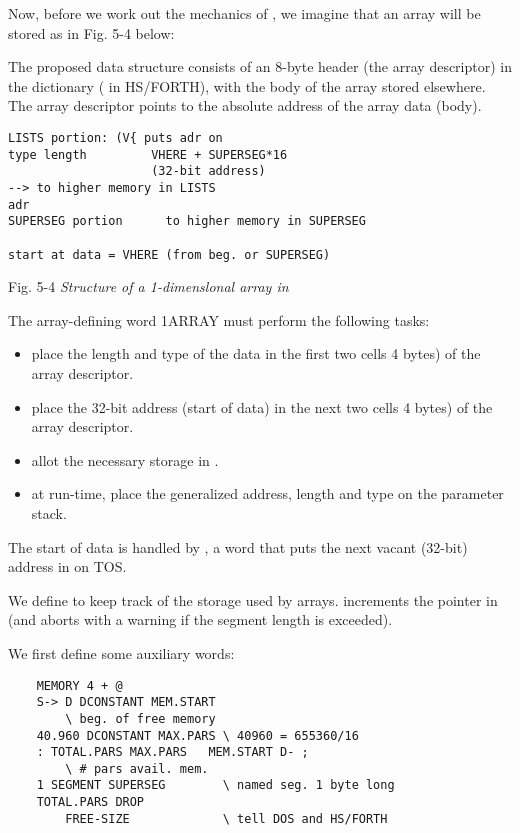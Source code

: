 {{Now, before we work out the mechanics of , we imagine that an array will be stored as in Fig. 5-4 below:

The proposed data structure consists of an 8-byte header (the array descriptor) in the dictionary ( in HS/FORTH), with the body of the array stored elsewhere. The array descriptor points to the absolute address of the array data (body).

\begin{lstlisting}
LISTS portion: (V{ puts adr on
type length         VHERE + SUPERSEG*16
                    (32-bit address)
--> to higher memory in LISTS 
adr
SUPERSEG portion      to higher memory in SUPERSEG

start at data = VHERE (from beg. or SUPERSEG)
\end{lstlisting}

Fig. 5-4 \textit{Structure of a 1-dimenslonal array in }

The array-defining word 1ARRAY must perform the following
tasks:

\begin{itemize}
    \item place the length and type of the data in the first two cells 4 bytes) of the array descriptor.
    \item place the 32-bit address (start of data) in the next two cells 4 bytes) of the array descriptor.
    \item allot the necessary storage in .
    \item at run-time, place the generalized address, length and type on the parameter stack.
\end{itemize}

The start of data is handled by , a word that puts the next vacant (32-bit) address in  on TOS.

We define  to keep track of the storage used by arrays.  increments the pointer in  (and aborts with a warning if the segment length is exceeded).

We first define some auxiliary words:
\begin{lstlisting}
    MEMORY 4 + @
    S-> D DCONSTANT MEM.START
        \ beg. of free memory
    40.960 DCONSTANT MAX.PARS \ 40960 = 655360/16
    : TOTAL.PARS MAX.PARS   MEM.START D- ;
        \ # pars avail. mem.
    1 SEGMENT SUPERSEG        \ named seg. 1 byte long
    TOTAL.PARS DROP
        FREE-SIZE             \ tell DOS and HS/FORTH


\end{lstlisting}}}
